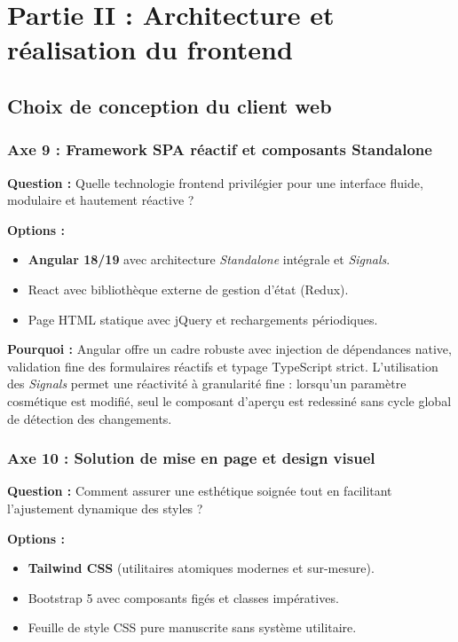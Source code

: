 \documentclass[11pt,a4paper]{article}
\begin{document}
\newpage

\section{Partie II : Architecture et réalisation du frontend}

\subsection{Choix de conception du client web}

\subsubsection{Axe 9 : Framework SPA réactif et composants Standalone}
\textbf{Question :} Quelle technologie frontend privilégier pour une interface fluide, modulaire et hautement réactive ?

\textbf{Options :}
\begin{itemize}
    \item[$\boxtimes$] \textbf{Angular 18/19} avec architecture \textit{Standalone} intégrale et \textit{Signals}.
    \item[$\square$] React avec bibliothèque externe de gestion d'état (Redux).
    \item[$\square$] Page HTML statique avec jQuery et rechargements périodiques.
\end{itemize}

\textbf{Pourquoi :} Angular offre un cadre robuste avec injection de dépendances native, validation fine des formulaires réactifs et typage TypeScript strict. L'utilisation des \textit{Signals} permet une réactivité à granularité fine : lorsqu'un paramètre cosmétique est modifié, seul le composant d'aperçu est redessiné sans cycle global de détection des changements.

\subsubsection{Axe 10 : Solution de mise en page et design visuel}
\textbf{Question :} Comment assurer une esthétique soignée tout en facilitant l'ajustement dynamique des styles ?

\textbf{Options :}
\begin{itemize}
    \item[$\boxtimes$] \textbf{Tailwind CSS} (utilitaires atomiques modernes et sur-mesure).
    \item[$\square$] Bootstrap 5 avec composants figés et classes impératives.
    \item[$\square$] Feuille de style CSS pure manuscrite sans système utilitaire.
\end{itemize}
\end{document}
